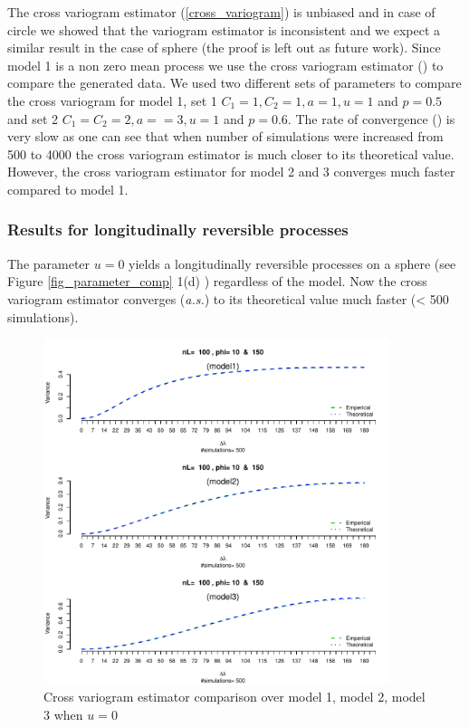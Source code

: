 The cross variogram estimator (\ref{cross_variogram}) is unbiased and in case of circle we showed that the variogram estimator is inconsistent and we expect a similar result in the case of sphere (the proof is left out as future work). Since model 1 is a non zero mean process we use the cross variogram estimator () to compare the generated data. We used two different sets of parameters to compare the cross variogram for model 1, set 1 $C_1 = 1, C_2 = 1, a = 1, u = 1$ and $p=0.5$ and set 2 $C_1 = C_2 = 2, a = =3, u = 1$ and $p=0.6$. The rate of convergence () is very slow as one can see that when number of simulations were increased from 500 to 4000 the cross variogram estimator is much closer to its theoretical value. However, the cross variogram estimator for model 2 and 3 converges much faster compared to model 1.  

\subsubsection{Results for longitudinally reversible processes}

The parameter $u = 0$ yields a longitudinally reversible processes on a sphere (see Figure \ref{fig_parameter_comp} 1(d) ) regardless of the model. Now the cross variogram estimator converges ({\em a.s.}) to its theoretical value much faster (< 500 simulations).          

\begin{figure}[H]
	\centering
	\includegraphics [width=0.9\textwidth ]{graphs/results_variogram_comparison}
	\caption[Variogram comparison]{Cross variogram estimator comparison over model 1, model 2, model 3 when $u=0$ }
\end{figure}

